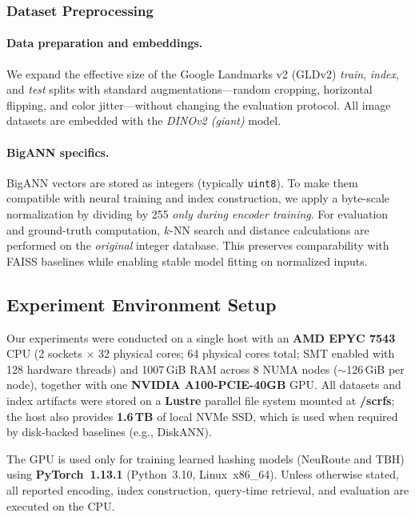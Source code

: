 \documentclass[sigconf, nonacm]{acmart}
\begin{document}
\subsubsection{Dataset Preprocessing}  

\paragraph{Data preparation and embeddings.}
We expand the effective size of the Google Landmarks v2 (GLDv2) \emph{train}, \emph{index}, and \emph{test} splits with standard augmentations—random cropping, horizontal flipping, and color jitter—without changing the evaluation protocol. All image datasets are embedded with the \emph{DINOv2 (giant)}\cite{ref43} model.

\paragraph{BigANN specifics.}
BigANN vectors are stored as integers (typically \texttt{uint8}). To make them compatible with neural training and index construction, we apply a byte-scale normalization by dividing by 255 \emph{only during encoder training}. 
For evaluation and ground-truth computation, \(k\)-NN search and distance calculations are performed on the \emph{original} integer database. 
This preserves comparability with FAISS baselines while enabling stable model fitting on normalized inputs.


\subsection{Experiment Environment Setup}
Our experiments were conducted on a single host with an \textbf{AMD EPYC 7543} CPU
(2 sockets $\times$ 32 physical cores; 64 physical cores total; SMT enabled with 128 hardware threads)
and 1007\,GiB RAM across 8 NUMA nodes ($\sim$126\,GiB per node), together with one
\textbf{NVIDIA A100-PCIE-40GB} GPU.
All datasets and index artifacts were stored on a \textbf{Lustre} parallel file system mounted at \textbf{/scrfs};
the host also provides \textbf{1.6\,TB} of local NVMe SSD, which is used when required by disk-backed baselines
(e.g., DiskANN).

The GPU is used only for training learned hashing models (NeuRoute and TBH) using
\textbf{PyTorch~1.13.1} (Python~3.10, Linux~x86\_64).
Unless otherwise stated, all reported encoding, index construction, query-time retrieval,
and evaluation are executed on the CPU.
\end{document}

